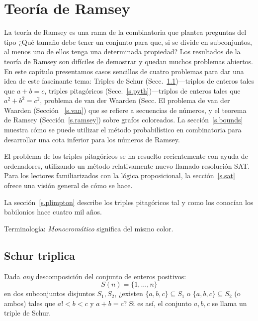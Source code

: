
\chapter{Teoría de Ramsey}\label{c.ramsey}


La teoría de Ramsey es una rama de la combinatoria que plantea preguntas del tipo ¿Qué tamaño debe tener un conjunto para que, si se divide en subconjuntos, al menos uno de ellos tenga una determinada propiedad?
Los resultados de la teoría de Ramsey son difíciles de demostrar y quedan muchos problemas abiertos. En este capítulo presentamos casos sencillos de cuatro problemas para dar una idea de este fascinante tema: Triples de Schur (Secc.~\ref{s.schur})---triplos de enteros tales que $a+b=c$, triples pitagóricos (Secc.~\ref{s.pyth})---triplos de enteros tales que $a^2+b^2=c^2$, problema de van der Waarden (Secc. El problema de van der Waarden (Sección ~\ref{s.van}) que se refiere a secuencias de números, y el teorema de Ramsey (Sección~\ref{s.ramsey}) sobre grafos coloreados. La sección~\ref{s.bounds} muestra cómo se puede utilizar el método probabilístico en combinatoria para desarrollar una cota inferior para los números de Ramsey.

El problema de los triples pitagóricos se ha resuelto recientemente con ayuda de ordenadores, utilizando un método relativamente nuevo llamado resolución SAT. Para los lectores familiarizados con la lógica proposicional, la sección~\ref{s.sat} ofrece una visión general de cómo se hace.

La sección~\ref{s.plimpton} describe los triples pitagóricos tal y como los conocían los babilonios hace cuatro mil años.

Terminología: \emph{Monocromático} significa del mismo color.


\section{Schur triplica}\label{s.schur}

\begin{definition}
Dada \emph{any} descomposición del conjunto de enteros positivos:
\[
S(n)=\{1,\ldots,n\}
\]
en dos subconjuntos disjuntos $S_1,S_2$, ¿existen $\{a,b,c\}\subseteq S_1$ o $\{a,b,c\}\subseteq S_2$ (o ambos) tales que $a!<\!b\!<\!c$ y $a+b=c$? Si es así, el conjunto $ {a,b,c}$ se llama un triple de Schur.
\end{definition}

